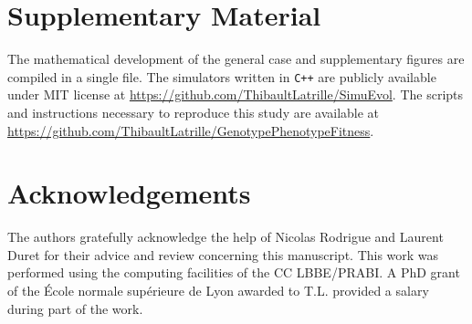 \documentclass[a4paper]{MBE}
\begin{document}
\maketitle




\section{Supplementary Material}
The mathematical development of the general case and supplementary figures are compiled in a single file.
The simulators written in \texttt{C++} are publicly available under MIT license at \url{https://github.com/ThibaultLatrille/SimuEvol}.
The scripts and instructions necessary to reproduce this study are available at \url{https://github.com/ThibaultLatrille/GenotypePhenotypeFitness}.

\section{Acknowledgements}

The authors gratefully acknowledge the help of Nicolas Rodrigue and Laurent Duret for their advice and review concerning this manuscript.
This work was performed using the computing facilities of the CC LBBE/PRABI.
A PhD grant of the École normale supérieure de Lyon awarded to T.L.
provided a salary during part of the work.


\end{document}
